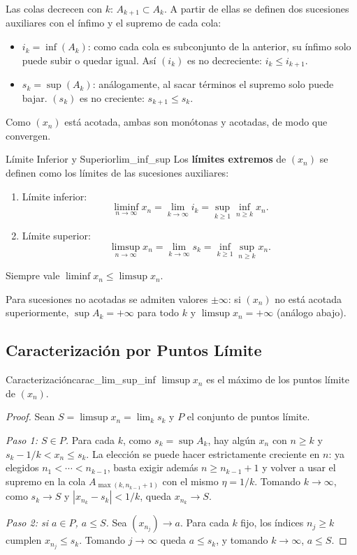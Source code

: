 \documentclass[11pt, a4paper]{article}
\begin{document}
Las colas decrecen con $k$: $A_{k+1} \subset A_k$. A partir de ellas se definen dos sucesiones
auxiliares con el ínfimo y el supremo de cada cola:
\begin{itemize}
    \item $i_k = \inf(A_k)$: como cada cola es subconjunto de la anterior, su ínfimo solo puede
    subir o quedar igual. Así $(i_k)$ es no decreciente: $i_k \le i_{k+1}$.
    \item $s_k = \sup(A_k)$: análogamente, al sacar términos el supremo solo puede bajar.
    $(s_k)$ es no creciente: $s_{k+1} \le s_k$.
\end{itemize}
Como $(x_n)$ está acotada, ambas son monótonas y acotadas, de modo que convergen.

\begin{definicion}{Límite Inferior y Superior}{lim_inf_sup}
Los \textbf{límites extremos} de $(x_n)$ se definen como los límites de las sucesiones auxiliares:
\begin{enumerate}
    \item Límite inferior:
    $$ \liminf_{n \to \infty} x_n = \lim_{k \to \infty} i_k = \sup_{k \ge 1} \inf_{n \ge k} x_n. $$
    \item Límite superior:
    $$ \limsup_{n \to \infty} x_n = \lim_{k \to \infty} s_k = \inf_{k \ge 1} \sup_{n \ge k} x_n. $$
\end{enumerate}
Siempre vale $\liminf x_n \le \limsup x_n$.
\end{definicion}

\obs Para sucesiones no acotadas se admiten valores $\pm\infty$: si $(x_n)$ no está acotada
superiormente, $\sup A_k = +\infty$ para todo $k$ y $\limsup x_n = +\infty$ (análogo abajo).

\subsection{Caracterización por Puntos Límite}

\begin{proposicion}{Caracterización}{carac_lim_sup_inf}
$\limsup x_n$ es el máximo de los puntos límite de $(x_n)$.
\end{proposicion}

\begin{proof}
Sean $S = \limsup x_n = \lim_k s_k$ y $P$ el conjunto de puntos límite.

\textit{Paso 1: $S \in P$.} Para cada $k$, como $s_k = \sup A_k$, hay algún $x_n$
con $n \ge k$ y $s_k - 1/k < x_n \le s_k$.
La elección se puede hacer estrictamente creciente en $n$:
ya elegidos $n_1 < \cdots < n_{k-1}$, basta exigir además $n \ge n_{k-1} + 1$
y volver a usar el supremo en la cola $A_{\max(k, n_{k-1}+1)}$ con el mismo $\eta = 1/k$.
Tomando $k \to \infty$, como $s_k \to S$ y $|x_{n_k} - s_k| < 1/k$, queda $x_{n_k} \to S$.

\textit{Paso 2: si $a \in P$, $a \le S$.} Sea $(x_{n_j}) \to a$.
Para cada $k$ fijo, los índices $n_j \ge k$ cumplen $x_{n_j} \le s_k$.
Tomando $j \to \infty$ queda $a \le s_k$, y tomando $k \to \infty$, $a \le S$.
\end{proof}
\end{document}
